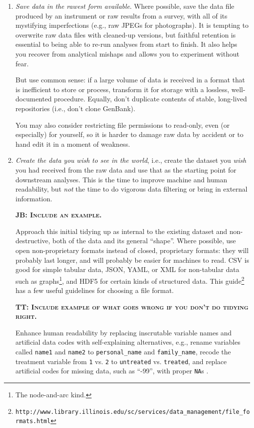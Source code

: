 \documentclass[10pt]{article}
\newcommand{\fixme}[2]{\textsc{\textbf{{#1}: {#2}}}}
\newcommand{\recommend}[1]{\textit{#1}}
\newcommand{\withurl}[2]{{#1}\footnote{\texttt{#2}}}
\begin{document}
\begin{enumerate}

\item
  \recommend{Save data in the rawest form available}.  Where possible,
  save the data file produced by an instrument or raw results from a
  survey, with all of its mystifying imperfections (e.g., raw JPEGs
  for photographs). It is tempting to overwrite raw data files with
  cleaned-up versions, but faithful retention is essential to being
  able to re-run analyses from start to finish. It also helps you
  recover from analytical mishaps and allows you to experiment without
  fear.

  But use common sense: if a large volume of data is received in a
  format that is inefficient to store or process, transform it for
  storage with a lossless, well-documented procedure.  Equally, don't
  duplicate contents of stable, long-lived repositories (i.e., don't
  clone GenBank).

  You may also consider restricting file permissions to read-only,
  even (or especially) for yourself, so it is harder to damage raw
  data by accident or to hand edit it in a moment of weakness.

\item
  \recommend{Create the data you wish to see in the world}, i.e.,
  create the dataset you \emph{wish} you had received from the raw
  data and use that as the starting point for downstream analyses.
  This is the time to improve machine and human readability, but
  \emph{not} the time to do vigorous data filtering or bring in
  external information.

  \fixme{JB}{Include an example.}

  Approach this initial tidying up as internal to the existing dataset
  and non-destructive, both of the data and its general ``shape''.
  Where possible, use open non-proprietary formats instead of closed,
  proprietary formats: they will probably last longer, and will
  probably be easier for machines to read.  CSV is good for simple
  tabular data, JSON, YAML, or XML for non-tabular data such as
  graphs\footnote{The node-and-arc kind.}, and HDF5 for certain kinds
  of structured data.  \withurl{This
    guide}{http://www.library.illinois.edu/sc/services/data\_management/file\_formats.html}
  has a few useful guidelines for choosing a file format.

  \fixme{TT}{Include example of what goes wrong if you don't do tidying right.}

  Enhance human readability by replacing inscrutable variable names
  and artificial data codes with self-explaining alternatives, e.g.,
  rename variables called \texttt{name1} and \texttt{name2} to
  \texttt{personal\_name} and \texttt{family\_name}, recode the
  treatment variable from \texttt{1} vs.  \texttt{2} to
  \texttt{untreated} vs. \texttt{treated}, and replace artificial
  codes for missing data, such as ``-99'', with proper \texttt{NA}s
  \cite{white2013}.


\end{enumerate}
\end{document}
